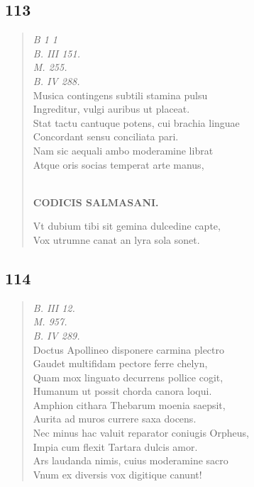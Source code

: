 \documentclass[11pt, a4paper]{report}
\begin{document}
            \subsection*{113}
      \begin{verse}
      \textit{B 1 1} \\ \textit{B. III 151.} \\ \textit{M. 255.} \\ \textit{B. IV 288.} \\ Musica contingens subtili stamina pulsu \\ Ingreditur, vulgi auribus ut placeat. \\ Stat tactu cantuque potens, cui brachia linguae \\ Concordant sensu conciliata pari. \\ Nam sic aequali ambo moderamine librat \\ Atque oris socias temperat arte manus, \\ 
        ﻿\pagebreak 
    \begin{center} \textbf{CODICIS SALMASANI.} \end{center}Vt dubium tibi sit gemina dulcedine capte, \\ Vox utrumne canat an lyra sola sonet. \\ 
      \end{verse}
  
            \subsection*{114}
      \begin{verse}
      \textit{B. III 12.} \\ \textit{M. 957.} \\ \textit{B. IV 289.} \\ Doctus Apollineo disponere carmina plectro \\ Gaudet multifidam pectore ferre chelyn, \\ Quam mox linguato decurrens pollice cogit, \\ Humanum ut possit chorda canora loqui. \\ Amphion cithara Thebarum moenia saepsit, \\ Aurita ad muros currere saxa docens. \\ Nec minus hac valuit reparator coniugis Orpheus, \\ Impia cum flexit Tartara dulcis amor. \\ Ars laudanda nimis, cuius moderamine sacro \\ Vnum ex diversis vox digitique canunt! \\ 
      \end{verse}
  
\end{document}
